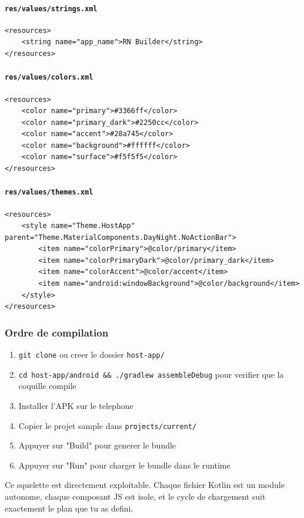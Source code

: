 \documentclass[11pt]{article}
\begin{document}
\paragraph{\texttt{res/values/strings.xml}}

\begin{verbatim}
<resources>
    <string name="app_name">RN Builder</string>
</resources>
\end{verbatim}

\paragraph{\texttt{res/values/colors.xml}}

\begin{verbatim}
<resources>
    <color name="primary">#3366ff</color>
    <color name="primary_dark">#2250cc</color>
    <color name="accent">#28a745</color>
    <color name="background">#ffffff</color>
    <color name="surface">#f5f5f5</color>
</resources>
\end{verbatim}

\paragraph{\texttt{res/values/themes.xml}}

\begin{verbatim}
<resources>
    <style name="Theme.HostApp" parent="Theme.MaterialComponents.DayNight.NoActionBar">
        <item name="colorPrimary">@color/primary</item>
        <item name="colorPrimaryDark">@color/primary_dark</item>
        <item name="colorAccent">@color/accent</item>
        <item name="android:windowBackground">@color/background</item>
    </style>
</resources>
\end{verbatim}

\subsubsection*{Ordre de compilation}

\begin{enumerate}
\item \texttt{git clone} ou creer le dossier \texttt{host-app/}
\item \texttt{cd host-app/android \&\& ./gradlew assembleDebug} pour verifier que la coquille compile
\item Installer l'APK sur le telephone
\item Copier le projet sample dans \texttt{projects/current/}
\item Appuyer sur "Build" pour generer le bundle
\item Appuyer sur "Run" pour charger le bundle dans le runtime
\end{enumerate}
Ce squelette est directement exploitable. Chaque fichier Kotlin est un module autonome, chaque composant JS est isole, et le cycle de chargement suit exactement le plan que tu as defini.
\end{document}
